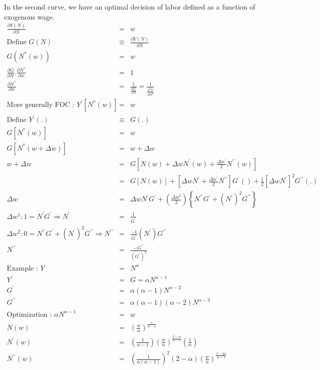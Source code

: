 In the second curve, we have an optimal decision of labor defined as a function of exogenous wage.
\begin{eqnarray}
\frac{\partial Y(N)}{\partial N} &=& w\nonumber\\
\mbox{Define } G(N) &\equiv& \frac{\partial Y(N)}{\partial N}\nonumber\\
G(N^*(w)) &=& w\nonumber\\
\frac{\partial G}{\partial N} . \frac{\partial N^*}{\partial w} &=& 1\nonumber\\
\frac{\partial N^*}{\partial w} &=& \frac{1}{\frac{\partial G}{\partial N}} = \frac{1}{\frac{\partial^2 Y}{\partial N^2}}\nonumber\\
\mbox{More generally FOC : } Y ^\prime \left[ N^*(w)\right] &=& w\nonumber\\
\mbox{Define } Y^\prime(.) &\equiv& G(.)\nonumber\\
G\left[ N^*(w)\right] &=& w\nonumber\\
G\left[ N^*(w+\Delta w)\right] &=& w+\Delta w\nonumber\\
w+\Delta w &=& G\left[ N(w) + \Delta w N ^\prime(w) + \frac{\Delta w ^\prime}{2} N^{\prime\prime} (w)\right]\nonumber\\
&=& G\left[N(w)\right] + \left[ \Delta w N^\prime + \frac{\Delta w ^\prime}{2} N^{\prime \prime} \right] G ^\prime () + \frac{1}{2} \left[ \Delta w N^\prime\right]^2 G ^{\prime \prime}(.)\nonumber\\
\Delta w &=& \Delta w N^\prime G^\prime + \left( \frac{\Delta w^2}{2}\right) \left\{ N^{\prime \prime} G ^ \prime + (N^\prime)^2 G ^{\prime\prime}\right\}\nonumber\\
\Delta w^1 : 1 = N^\prime G ^ \prime \Longrightarrow N^\prime &=& \frac{1}{G^\prime} \\
\Delta w^2 : 0 = N^{\prime \prime} G ^ \prime +(N^\prime)^2 G^{\prime \prime}\Longrightarrow N^{\prime\prime} &=& \frac{-1}{G^\prime} (N^\prime) G^{\prime\prime} \nonumber\\
N^{\prime\prime} &=& \frac{-G ^{\prime \prime}}{(G^\prime)^3}\\
\mbox{Example : } Y &=& N^\alpha \nonumber\\
Y^\prime &=& G = \alpha N^{\alpha -1}\nonumber\\
G^\prime &=& \alpha (\alpha -1) N^{\alpha -2}\nonumber\\
G^{\prime\prime} &=& \alpha (\alpha -1)(\alpha -2) N^{\alpha -3}\nonumber\\
\mbox{Optimization : } \alpha N^{\alpha -1} &=& w\nonumber\\
N(w) &=& \left( \frac{w}{\alpha}\right) ^{\frac{1}{\alpha -1}}\nonumber\\
N^\prime(w) &=& \left(\frac{1}{\alpha -1}\right) \left(\frac{w}{\alpha}\right) ^{\frac{2-\alpha}{\alpha -1}} \left(\frac{1}{\alpha} \right)\nonumber\\
N^{\prime\prime}(w) &=& \left(\frac{1}{\alpha(\alpha -1)}\right)^2 (2-\alpha) \left(\frac{w}{\alpha}\right) ^{\frac{3-2\alpha}{\alpha -1}}\nonumber
\end{eqnarray}
